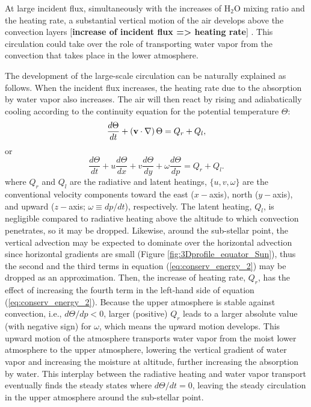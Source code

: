 \documentclass[11pt,numberedappendix,twocolappendix,]{emulateapj}
\def\water{H$_2$O }
\def\memo#1{\color{red}$[${\bf #1}$]$ \color{black}}
\begin{document}
At large incident flux, simultaneously with the increases of \water mixing ratio and the heating rate, a substantial vertical motion of the air develops above the convection layers \memo{increase of incident flux => heating rate}. 
This circulation could take over the role of transporting water vapor from the convection that takes place in the lower atmosphere. 


The development of the large-scale circulation can be naturally explained as follows. 
When the incident flux increases, the heating rate due to the absorption by water vapor also increases. 
The air will then react by rising and adiabatically cooling according to the continuity equation for the potential temperature $\Theta $:
\begin{equation}
\frac{d\Theta }{dt} + ( {\bf v} \cdot \nabla ) \, \Theta = Q_r + Q_l, \label{eq:conserv_energy}
\end{equation}
or
\begin{equation}
\frac{d\Theta }{dt} + u \frac{d\Theta }{dx} + v \frac{d\Theta }{dy} + \omega \frac{d\Theta }{dp} = Q_r + Q_l. \label{eq:conserv_energy_2}
\end{equation}
where $Q_r$ and $Q_l$ are the radiative and latent heatings, $\{ u, v, \omega \}$ are the conventional velocity components toward the east ($x-$axis), north ($y-$axis), and upward ($z-$axis; $\omega \equiv  dp/dt$), respectively. 
The latent heating, $Q_l$, is negligible compared to radiative heating above the altitude to which convection penetrates, so it may be dropped. 
Likewise, around the sub-stellar point, the vertical advection may be expected to dominate over the horizontal advection since horizontal gradients are small (Figure \ref{fig:3Dprofile_equator_Sun}), thus the second and the third terms in equation (\ref{eq:conserv_energy_2}) may be dropped as an approximation. 
Then, the increase of heating rate, $Q_r$, has the effect of increasing the fourth term in the left-hand side of equation (\ref{eq:conserv_energy_2}). 
Because the upper atmosphere is stable against convection, i.e., $d \Theta / d p < 0 $, larger (positive) $Q_r$ leads to a larger absolute value (with negative sign) for $\omega $, which means the upward motion develops. 
This upward motion of the atmosphere transports water vapor from the moist lower atmosphere to the upper atmosphere, lowering the vertical gradient of water vapor and increasing the moisture at altitude, further increasing the absorption by water. 
This interplay between the radiative heating and water vapor transport eventually finds the steady states where $d\Theta/dt = 0$, leaving the steady circulation in the upper atmosphere around the sub-stellar point. 
\end{document}
